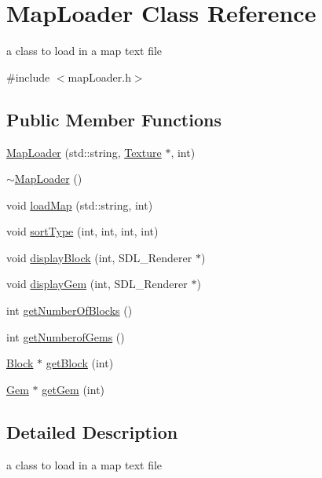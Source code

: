 \hypertarget{class_map_loader}{\section{Map\+Loader Class Reference}
\label{class_map_loader}
}


a class to load in a map text file  




{\ttfamily \#include $<$map\+Loader.\+h$>$}

\subsection*{Public Member Functions}
\begin{DoxyCompactItemize}
\item 
\hyperlink{class_map_loader_a759260eb5a2bcc71f4eb6e03e8d8dead}{Map\+Loader} (std\+::string, \hyperlink{class_texture}{Texture} $\ast$, int)
\item 
\hyperlink{class_map_loader_a6055310649b9a926301d7fb2b83cb1b1}{$\sim$\+Map\+Loader} ()
\item 
void \hyperlink{class_map_loader_aa3f95e47879ef5d2ac8f9b4e80602412}{load\+Map} (std\+::string, int)
\item 
void \hyperlink{class_map_loader_a5d094d7c804670f68e04c360cb9b5965}{sort\+Type} (int, int, int, int)
\item 
void \hyperlink{class_map_loader_a0430f4acdbe19fd6853a61e3b9f71543}{display\+Block} (int, S\+D\+L\+\_\+\+Renderer $\ast$)
\item 
void \hyperlink{class_map_loader_adf524d17cab14e1096341100abfe92b2}{display\+Gem} (int, S\+D\+L\+\_\+\+Renderer $\ast$)
\item 
int \hyperlink{class_map_loader_a178ca855ceec126f0a3a2264b74f63cc}{get\+Number\+Of\+Blocks} ()
\item 
int \hyperlink{class_map_loader_a026a7c38e03cdee9a355b09ca6048daa}{get\+Numberof\+Gems} ()
\item 
\hyperlink{class_block}{Block} $\ast$ \hyperlink{class_map_loader_a161a0cc6a392abc9baa57e919023f25c}{get\+Block} (int)
\item 
\hyperlink{class_gem}{Gem} $\ast$ \hyperlink{class_map_loader_a9b56fda5f4c27614131b085b449fe183}{get\+Gem} (int)
\end{DoxyCompactItemize}


\subsection{Detailed Description}
a class to load in a map text file 

